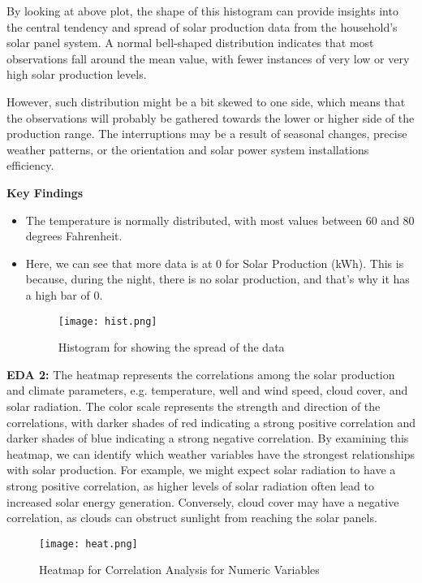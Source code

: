 \documentclass[conference]{IEEEtran}
\begin{document}
By looking at above plot, the shape of this histogram can provide insights into the central tendency and spread of solar production data from the household's solar panel system. A normal bell-shaped distribution indicates that most observations fall around the mean value, with fewer instances of very low or very high solar production levels.

However, such distribution might be a bit skewed to one side, which means that the observations will probably be gathered towards the lower or higher side of the production range. The interruptions may be a result of seasonal changes, precise weather patterns, or the orientation and solar power system installations efficiency.

\textbf{Key Findings}
\begin{itemize}
\item The temperature is normally distributed, with most values between 60 and 80 degrees Fahrenheit.
\item Here, we can see that more data is at 0 for Solar Production (kWh). This is because, during the night, there is no solar production, and that’s why it has a high bar of 0.
\begin{figure}[H] %
    \centering
    \texttt{[image: hist.png]}
    \caption{Histogram for showing the spread of the data}
    \label{fig:technical_workflow}
\end{figure}
\end{itemize}
\textbf{EDA 2:} The heatmap represents the correlations among the solar production and climate parameters, e.g. temperature, well and wind speed, cloud cover, and solar radiation. The color scale represents the strength and direction of the correlations, with darker shades of red indicating a strong positive correlation and darker shades of blue indicating a strong negative correlation.
By examining this heatmap, we can identify which weather variables have the strongest relationships with solar production. For example, we might expect solar radiation to have a strong positive correlation, as higher levels of solar radiation often lead to increased solar energy generation. Conversely, cloud cover may have a negative correlation, as clouds can obstruct sunlight from reaching the solar panels.
\begin{figure}[H] %
    \centering
    \texttt{[image: heat.png]}
    \caption{Heatmap for Correlation Analysis for Numeric Variables}
    \label{fig:technical_workflow}
\end{figure}
\end{document}
